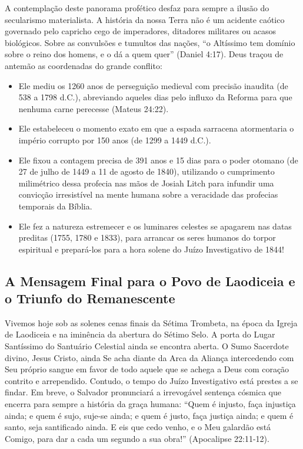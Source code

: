 A contemplação deste panorama profético desfaz para sempre a ilusão do secularismo materialista. A história da nossa Terra não é um acidente caótico governado pelo capricho cego de imperadores, ditadores militares ou acasos biológicos. Sobre as convulsões e tumultos das nações, ``o Altíssimo tem domínio sobre o reino dos homens, e o dá a quem quer'' (Daniel 4:17).
Deus traçou de antemão as coordenadas do grande conflito:
\begin{itemize}
  \item Ele mediu os 1260 anos de perseguição medieval com precisão inaudita (de 538 a 1798 d.C.), abreviando aqueles dias pelo influxo da Reforma para que nenhuma carne perecesse (Mateus 24:22).
  \item Ele estabeleceu o momento exato em que a espada sarracena atormentaria o império corrupto por 150 anos (de 1299 a 1449 d.C.).
  \item Ele fixou a contagem precisa de 391 anos e 15 dias para o poder otomano (de 27 de julho de 1449 a 11 de agosto de 1840), utilizando o cumprimento milimétrico dessa profecia nas mãos de Josiah Litch para infundir uma convicção irresistível na mente humana sobre a veracidade das profecias temporais da Bíblia.
  \item Ele fez a natureza estremecer e os luminares celestes se apagarem nas datas preditas (1755, 1780 e 1833), para arrancar os seres humanos do torpor espiritual e prepará-los para a hora solene do Juízo Investigativo de 1844!
\end{itemize}




\subsection{A Mensagem Final para o Povo de Laodiceia e o Triunfo do Remanescente}


Vivemos hoje sob as solenes cenas finais da Sétima Trombeta, na época da Igreja de Laodiceia e na iminência da abertura do Sétimo Selo.
A porta do Lugar Santíssimo do Santuário Celestial ainda se encontra aberta. O Sumo Sacerdote divino, Jesus Cristo, ainda Se acha diante da Arca da Aliança intercedendo com Seu próprio sangue em favor de todo aquele que se achega a Deus com coração contrito e arrependido.
Contudo, o tempo do Juízo Investigativo está prestes a se findar. Em breve, o Salvador pronunciará a irrevogável sentença cósmica que encerra para sempre a história da graça humana:
``Quem é injusto, faça injustiça ainda; e quem é sujo, suje-se ainda; e quem é justo, faça justiça ainda; e quem é santo, seja santificado ainda. E eis que cedo venho, e o Meu galardão está Comigo, para dar a cada um segundo a sua obra!'' (Apocalipse 22:11-12).

